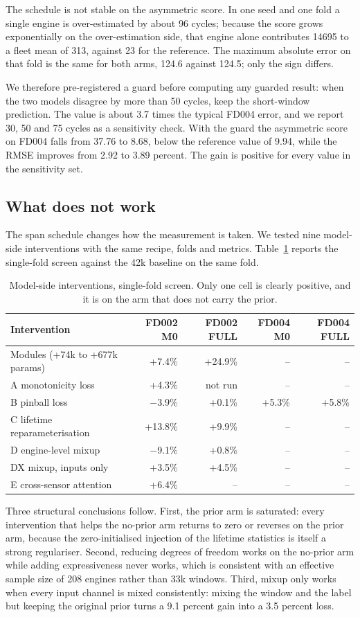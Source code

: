 The schedule is not stable on the asymmetric score. In one seed and one fold a single engine is over-estimated by about 96 cycles; because the score grows exponentially on the over-estimation side, that engine alone contributes 14695 to a fleet mean of 313, against 23 for the reference. The maximum absolute error on that fold is the same for both arms, 124.6 against 124.5; only the sign differs.

We therefore pre-registered a guard before computing any guarded result: when the two models disagree by more than 50 cycles, keep the short-window prediction. The value is about 3.7 times the typical FD004 error, and we report 30, 50 and 75 cycles as a sensitivity check. With the guard the asymmetric score on FD004 falls from 37.76 to 8.68, below the reference value of 9.94, while the RMSE improves from 2.92 to 3.89 percent. The gain is positive for every value in the sensitivity set.

\subsection{What does not work}

The span schedule changes how the measurement is taken. We tested nine model-side interventions with the same recipe, folds and metrics. Table~\ref{tab:neg} reports the single-fold screen against the 42k baseline on the same fold.

\begin{table}[t]
\centering
\caption{Model-side interventions, single-fold screen. Only one cell is clearly positive, and it is on the arm that does not carry the prior.}
\label{tab:neg}
\small
\begin{tabular}{lrrrr}
\toprule
Intervention & FD002 M0 & FD002 FULL & FD004 M0 & FD004 FULL \\
\midrule
Modules (+74k to +677k params) & +7.4\% & +24.9\% & -- & -- \\
A monotonicity loss & +4.3\% & not run & -- & -- \\
B pinball loss & $-$3.9\% & +0.1\% & +5.3\% & +5.8\% \\
C lifetime reparameterisation & +13.8\% & +9.9\% & -- & -- \\
D engine-level mixup & $-$9.1\% & +0.8\% & -- & -- \\
DX mixup, inputs only & +3.5\% & +4.5\% & -- & -- \\
E cross-sensor attention & +6.4\% & -- & -- & -- \\
\bottomrule
\end{tabular}
\end{table}

Three structural conclusions follow. First, the prior arm is saturated: every intervention that helps the no-prior arm returns to zero or reverses on the prior arm, because the zero-initialised injection of the lifetime statistics is itself a strong regulariser. Second, reducing degrees of freedom works on the no-prior arm while adding expressiveness never works, which is consistent with an effective sample size of 208 engines rather than 33k windows. Third, mixup only works when every input channel is mixed consistently: mixing the window and the label but keeping the original prior turns a 9.1 percent gain into a 3.5 percent loss.
